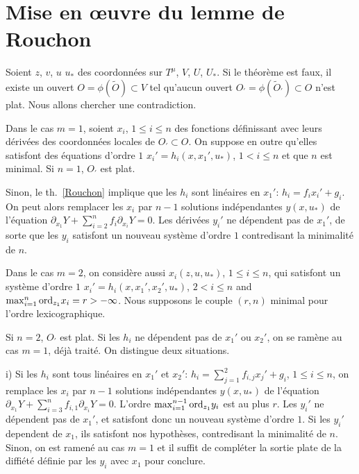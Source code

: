 \documentclass[A4paper, 12pt]{article}
\def\ord{{\rm ord}}
\begin{document}
\section{Mise en œuvre du lemme de Rouchon}

\noindent Soient $z$, $v$, $u$ $u_{\ast}$ des coordonnées sur
$T^{\mu}$, $V$, $U$, $U_{\ast}$. Si le théorème est faux, il existe un
ouvert $O=\phi(\tilde O)\subset V$ tel qu'aucun ouvert
$O_{\prime}=\phi(\tilde O_{\prime})\subset O$ n'est plat. Nous allons
chercher une contradiction.
\medskip

Dans le cas $m=1$, soient
$x_{i}$, $1\le i\le n$ des fonctions définissant avec leurs dérivées des
coordonnées locales de $O_{\prime}\subset O$. On suppose en outre
qu'elles satisfont des équations d'ordre $1$
$x_{i}'=h_{i}(x, x_{1}', u_{\ast})$, $1<i\le n$ et que $n$ est
minimal. Si $n=1$, $O_{\prime}$ est plat. 

Sinon, le th.~\ref{Rouchon} implique que les $h_{i}$ sont linéaires en
$x_{1}'$: $h_{i}=f_{i}x_{i}'+g_{i}$. On peut alors remplacer les $x_{i}$
par $n-1$ solutions indépendantes $y(x,u_{\ast})$ de l'équation 
$\partial_{x_{1}} Y+\sum_{i=2}^{n}f_{i}\partial_{x_{i}}
Y=0$. Les dérivées $y_{i}'$ ne dépendent pas de $x_{1}'$, de sorte que
les $y_{i}$ satisfont un nouveau système d'ordre $1$ contredisant la
minimalité de $n$.
\medskip

Dans le cas $m=2$, on considère aussi $x_{i}(z,u,u_{\ast})$, $1\le i\le n$,
qui satisfont un système d'ordre $1$ $x_{i}'=h_{i}(x, x_{1}',
x_{2}',u_{\ast})$, $2<i\le n$ and 
$\max_{i=1}^{n}\ord_{z_{1}} x_{i}=r>-\infty$. Nous supposons le couple
$(r, n)$ minimal pour l'ordre lexicographique.

Si $n=2$, $O_{\prime}$ est plat. Si les $h_{i}$ ne dépendent pas de
$x_{1}'$ ou $x_{2}'$, on se ramène au cas $m=1$, déjà traité.
On distingue deux situations.
\smallskip


i) Si les $h_{i}$ sont tous linéaires en $x_{1}'$ et $x_{2}'$: 
$h_{i}=\sum_{j=1}^{2}f_{i,j}x_{j}'+g_{i}$,
$1\le i\le n$, on remplace les $x_{i}$ par $n-1$ solutions
indépendantes $y(x, u_{\ast})$ de l'équation $\partial_{x_{1}}
Y+\sum_{i=3}^{n}f_{i,1}\partial_{x_{i}} Y=0$. L'ordre
$\max_{i=1}^{n-1}\ord_{z_{1}} y_{i}$ est au plus $r$. Les $y_{i}'$ ne
dépendent pas de $x_{1}'$, et satisfont donc un nouveau système
d'ordre $1$. Si les $y_{i}'$ dependent de $x_{1}$, ils satisfont nos
hypothèses, contredisant la minimalité de $n$. Sinon, on est ramené au cas
$m=1$ et il suffit de compléter la sortie plate de la diffiété définie
par les $y_{i}$ avec $x_{1}$ pour conclure.
\smallskip
\end{document}
